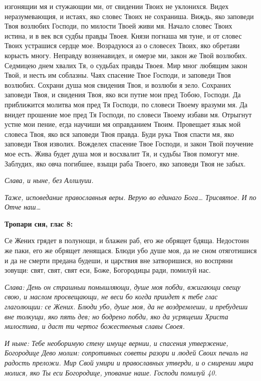 изгонящии мя и стужающии ми, от свидении Твоих не уклонихся.
Видех неразумевающия, и истаях, яко словес Твоих не сохраниша.
Виждь, яко заповеди Твоя возлюбих Господи, по милости Твоей живи
мя. Начало словес Твоих истина, и в век вся судбы правды Твоея.
Князи погнаша мя туне, и от словес Твоих устрашися сердце мое.
Возрадуюся аз о словесех Твоих, яко обретаяи корысть многу. Неправду
возненавидех, и омерзе ми, закон же Твой возлюбих. Седмицею днем
хвалих Тя, о судьбах правды Твоея. Мир мног любящим закон Твой, и
несть им соблазны. Чаях спасение Твое Господи, и заповеди Твоя
возлюбих. Сохрани душа моя свидения Твоя, и возлюби я зело. Сохраних
заповеди Твоя, и свидения Твоя, яко вси путие мои пред Тобою,
Господи. Да приближится молитва моя пред Тя Господи, по словеси
Твоему вразуми мя. Да внидет прошение мое пред Тя Господи, по
словеси Твоему избави мя. Отрыгнут устне мои пение, егда научиши мя
оправданием Твоим. Провещает язык мой словеса Твоя, яко вся заповеди
Твоя правда. Буди рука Твоя спасти мя, яко заповеди Твоя изволих.
Вожделех спасение Твое Господи, и закон Твой поучение мое есть.
Жива будет душа моя и восхвалит Тя, и судьбы Твоя помогут мне.
Заблудих, яко овча погибшее, взыщи раба Твоего, яко заповеди Твоя не
забых.


 \itshape Слава, и ныне\normalfont{}, \itshape без Аллилуии.\normalfont{}


 \itshape Таже, исповедание православныя веры.\normalfont{} Верую во единаго Бога…
\itshape Трисвятое\normalfont{}. \itshape И по\normalfont{} Отче наш…






 

\bfseries Тропари сия, глас 8:\normalfont{}


   Се Жених грядет в полунощи, и блажен раб, его же обрящет бдяща.
Недостоин же паки, его же обрящет ленящася. Блюди убо душе моя, да не
сном отяготишися и да не смерти предана будеши, и царствия вне
затворишися, но воспряни зовущи: свят, свят, свят еси, Боже, Богородицы
ради, помилуй нас.


 \itshape Слава:\normalfont{} День он страшныи помышляющи, душе моя побди, вжигающи
свещу свою, и маслом просвещающи, не веси бо когда приидет к тебе глас
глаголющии: се Жених. Блюди убо, душе моя, да не воздремлеши,
и пребудеши вне толкущи, яко пять дев; но бодрено побди, яко да
усрящеши Христа милостива, и даст ти чертог божественыя славы
Своея.



 \itshape И ныне:\normalfont{} Тебе необоримую стену имуще вернии, и спасения утвержение,
Богородице Дево молим: сопротивных советы разори и людей Своих печаль
на радость преложи. Мир Свой умири и православных утверди, и о смирении
мира молися, яко Ты еси Богородице, упование наше. Господи помилуй
\itshape 40\normalfont{}.


